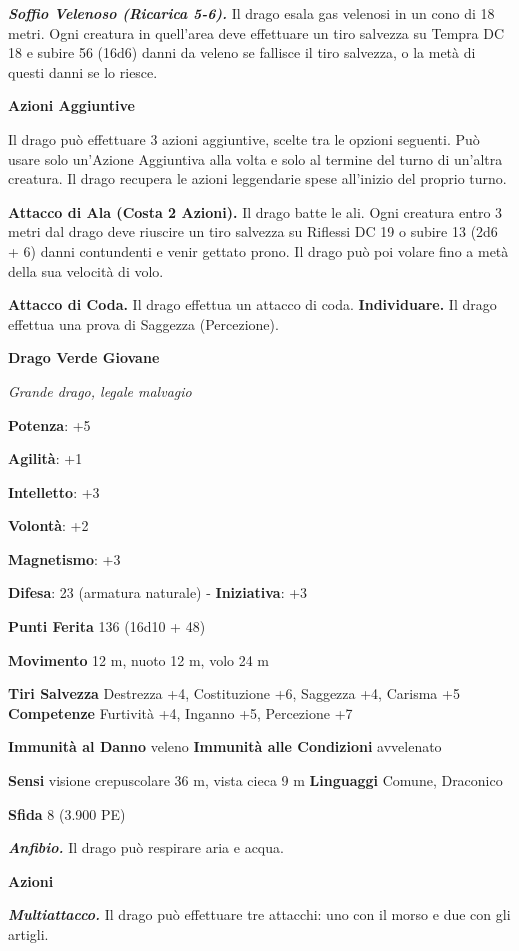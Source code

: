 \begin{multicols}{2}
\emph{\textbf{Soffio Velenoso (Ricarica 5-6).}} Il drago esala gas
velenosi in un cono di 18 metri. Ogni creatura in quell'area deve
effettuare un tiro salvezza su Tempra DC 18 e subire 56 (16d6)
danni da veleno se fallisce il tiro salvezza, o la metà di questi danni
se lo riesce.

\textbf{Azioni Aggiuntive}

Il drago può effettuare 3 azioni aggiuntive, scelte tra le opzioni
seguenti. Può usare solo un'Azione Aggiuntiva alla volta e solo al
termine del turno di un'altra creatura. Il drago recupera le azioni
leggendarie spese all'inizio del proprio turno.

\textbf{Attacco di Ala (Costa 2 Azioni).} Il drago batte le ali. Ogni
creatura entro 3 metri dal drago deve riuscire un tiro salvezza su Riflessi DC 19 o subire 13 (2d6 + 6) danni contundenti e venir gettato
prono. Il drago può poi volare fino a metà della sua velocità di volo.

\textbf{Attacco di Coda.} Il drago effettua un attacco di coda.
\textbf{Individuare.} Il drago effettua una prova di Saggezza
(Percezione).

\textbf{Drago Verde Giovane}

\emph{Grande drago, legale malvagio}

\textbf{Potenza}: +5

\textbf{Agilità}: +1

\textbf{Intelletto}: +3

\textbf{Volontà}: +2

\textbf{Magnetismo}: +3

\textbf{Difesa}: 23 (armatura naturale) - \textbf{Iniziativa}: +3

\textbf{Punti Ferita} 136 (16d10 + 48)

\textbf{Movimento} 12 m, nuoto 12 m, volo 24 m

\textbf{Tiri Salvezza} Destrezza +4, Costituzione +6, Saggezza +4,
Carisma +5 \textbf{Competenze} Furtività +4, Inganno +5, Percezione +7

\textbf{Immunità al Danno} veleno \textbf{Immunità alle Condizioni}
avvelenato

\textbf{Sensi} visione crepuscolare 36 m, vista cieca 9 m
\textbf{Linguaggi} Comune, Draconico

\textbf{Sfida} 8 (3.900 PE)

\emph{\textbf{Anfibio.}} Il drago può respirare aria e acqua.

\textbf{Azioni}

\emph{\textbf{Multiattacco.}} Il drago può effettuare tre attacchi: uno
con il morso e due con gli artigli.


\end{multicols}

